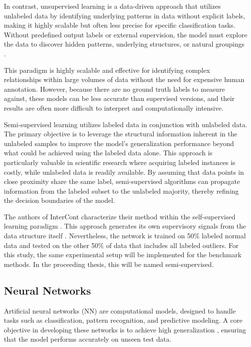In contrast, unsupervised learning is a data-driven approach that utilizes unlabeled data by identifying underlying patterns in data without explicit labels, making it highly scalable but often less precise for specific classification tasks.
Without predefined output labels or external supervision, the model must explore the data to discover hidden patterns, underlying structures, or natural groupings \citep[p.4]{sarker2021machine}. 

\newpage
This paradigm is highly scalable and effective for identifying complex relationships within large volumes of data without the need for expensive human annotation. 
However, because there are no ground truth labels to measure against, these models can be less accurate than supervised versions, and their results are often more difficult to interpret and computationally intensive.


Semi-supervised learning utilizes labeled data in conjunction with unlabeled data.
The primary objective is to leverage the structural information inherent in the unlabeled samples to improve the model's generalization performance beyond what could be achieved using the labeled data alone.
This approach is particularly valuable in scientific research where acquiring labeled instances is costly, while unlabeled data is readily available. 
By assuming that data points in close proximity share the same label, semi-supervised algorithms can propagate information from the labeled subset to the unlabeled majority, thereby refining the decision boundaries of the model.


The authors of InterCont characterize their method within the self-supervised learning paradigm \citep[p. 3]{shenkar2022anomaly}. 
This approach generates its own supervisory signals from the data structure itself \citep{jaiswal2020survey}. 
Nevertheless, the network is trained on 50\% labeled normal data and tested on the other 50\% of data that includes all labeled outliers.
For this study, the same experimental setup will be implemented for the benchmark methods.
In the proceeding thesis, this will be named semi-supervised.   


\subsection{Neural Networks}
Artificial neural networks (NN) are computational models, designed to handle tasks such as classification, pattern recognition, and predictive modeling. 
A core objective in developing these networks is to achieve high generalization \citep[p. 1]{zhang2021understanding}, ensuring that the model performs accurately on unseen test data.


